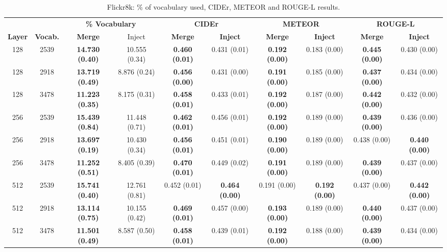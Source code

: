 \documentclass[11pt,letterpaper]{article}
\begin{document}
\begin{table*}[!t]
\centering
\begin{scriptsize}
\setlength\tabcolsep{2pt}

\begin{subtable}{\textwidth}
  \centering
  \begin{tabular}{|cc|cc|cc|cc|cc|}
  \hline
  & & \multicolumn{2}{|c|}{\bf \% Vocabulary} & \multicolumn{2}{|c|}{\bf CIDEr} & \multicolumn{2}{|c|}{\bf METEOR} & \multicolumn{2}{|c|}{\bf ROUGE-L} \\
  \bf Layer & \bf Vocab. & \bf Merge & Inject & \bf Merge & \bf Inject & \bf Merge & \bf Inject & \bf Merge & \bf Inject \\
  \hline
  128	& 2539	& \bf 14.730 (0.40)	& 10.555 (0.34)	& \bf 0.460 (0.01)	& 0.431 (0.01)	& \bf 0.192 (0.00)	& 0.183 (0.00)	& \bf 0.445 (0.00)	& 0.430 (0.00) \\
  128	& 2918	& \bf 13.719 (0.49)	& 8.876 (0.24)	& \bf 0.456 (0.00)	& 0.431 (0.00)	& \bf 0.191 (0.00)	& 0.185 (0.00)	& \bf 0.437 (0.00)	& 0.434 (0.00) \\
  128	& 3478	& \bf 11.223 (0.35)	& 8.175 (0.31)	& \bf 0.458 (0.01)	& 0.433 (0.01)	& \bf 0.192 (0.00)	& 0.187 (0.00)	& \bf 0.442 (0.00)	& 0.432 (0.00) \\
  \hline
  256	& 2539	& \bf 15.439 (0.84)	& 11.448 (0.71)	& \bf 0.462 (0.01)	& 0.456 (0.01)	& \bf 0.192 (0.00)	& 0.189 (0.00)	& \bf 0.439 (0.00)	& 0.436 (0.00) \\
  256	& 2918	& \bf 13.697 (0.19)	& 10.430 (0.34)	& \bf 0.456 (0.01)	& 0.451 (0.01)	& \bf 0.190 (0.00)	& 0.189 (0.00)	& 0.438 (0.00)	& \bf 0.440 (0.00) \\
  256	& 3478	& \bf 11.252 (0.51)	& 8.405 (0.39)	& \bf 0.470 (0.01)	& 0.449 (0.02)	& \bf 0.191 (0.00)	& 0.189 (0.00)	& \bf 0.439 (0.00)	& 0.437 (0.00) \\
  \hline
  512	& 2539	& \bf 15.741 (0.40)	& 12.761 (0.81)	& 0.452 (0.01)	& \bf 0.464 (0.00)	& 0.191 (0.00)	& \bf 0.192 (0.00)	& 0.437 (0.00)	& \bf 0.442 (0.00) \\
  512	& 2918	& \bf 13.114 (0.75)	& 10.155 (0.42)	& \bf 0.469 (0.01)	& 0.457 (0.00)	& \bf 0.193 (0.00)	& 0.189 (0.00)	& \bf 0.440 (0.00)	& 0.437 (0.00) \\
  512	& 3478	& \bf 11.501 (0.49)	& 8.587 (0.50)	& \bf 0.458 (0.01)	& 0.439 (0.01)	& \bf 0.192 (0.00)	& 0.188 (0.00)	& \bf 0.439 (0.00)	& 0.434 (0.00) \\
  \hline
  \end{tabular}
  \caption{\label{tbl:results_flickr8k_1} Flickr8k: \% of vocabulary used, CIDEr, METEOR and ROUGE-L results.}
\end{subtable}
\vspace{10pt}


\end{scriptsize}
\end{table*}
\end{document}
